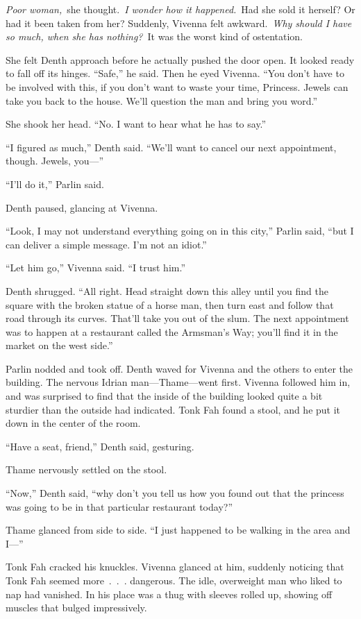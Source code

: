 \textit{Poor woman,}~she thought.~\textit{I wonder how it happened.}~Had she sold it herself? Or had it been taken from her? Suddenly, Vivenna felt awkward.~\textit{Why should I have so much, when she has nothing?}~It was the worst kind of ostentation.

She felt Denth approach before he actually pushed the door open. It looked ready to fall off its hinges. “Safe,” he said. Then he eyed Vivenna. “You don’t have to be involved with this, if you don’t want to waste your time, Princess. Jewels can take you back to the house. We’ll question the man and bring you word.”

She shook her head. “No. I want to hear what he has to say.”

“I figured as much,” Denth said. “We’ll want to cancel our next appointment, though. Jewels, you—”

“I’ll do it,” Parlin said.

Denth paused, glancing at Vivenna.

“Look, I may not understand everything going on in this city,” Parlin said, “but I can deliver a simple message. I’m not an idiot.”

“Let him go,” Vivenna said. “I trust him.”

Denth shrugged. “All right. Head straight down this alley until you find the square with the broken statue of a horse man, then turn east and follow that road through its curves. That’ll take you out of the slum. The next appointment was to happen at a restaurant called the Armsman’s Way; you’ll find it in the market on the west side.”

Parlin nodded and took off. Denth waved for Vivenna and the others to enter the building. The nervous Idrian man—Thame—went first. Vivenna followed him in, and was surprised to find that the inside of the building looked quite a bit sturdier than the outside had indicated. Tonk Fah found a stool, and he put it down in the center of the room.

“Have a seat, friend,” Denth said, gesturing.

Thame nervously settled on the stool.

“Now,” Denth said, “why don’t you tell us how you found out that the princess was going to be in that particular restaurant today?”

Thame glanced from side to side. “I just happened to be walking in the area and I—”

Tonk Fah cracked his knuckles. Vivenna glanced at him, suddenly noticing that Tonk Fah seemed more~.~.~. dangerous. The idle, overweight man who liked to nap had vanished. In his place was a thug with sleeves rolled up, showing off muscles that bulged impressively.

